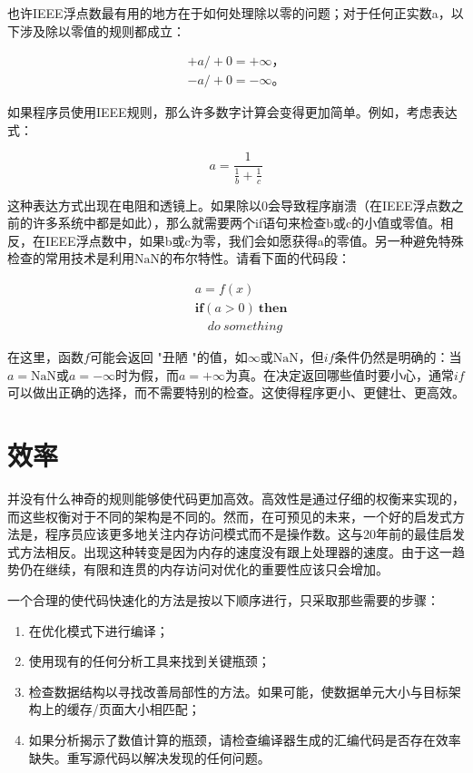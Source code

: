 \documentclass[lang=cn,12pt]{elegantbook}
\begin{document}
也许IEEE浮点数最有用的地方在于如何处理除以零的问题；对于任何正实数a，以下涉及除以零值的规则都成立：

\[
  \begin{aligned}
  +a /+0=+\infty， \\
  -a /+0=-\infty。 
  \end{aligned}
\]


如果程序员使用IEEE规则，那么许多数字计算会变得更加简单。例如，考虑表达式：

\[a=\frac{1}{\frac{1}{b}+\frac{1}{c}}\]

这种表达方式出现在电阻和透镜上。如果除以0会导致程序崩溃（在IEEE浮点数之前的许多系统中都是如此），那么就需要两个if语句来检查b或c的小值或零值。相反，在IEEE浮点数中，如果b或c为零，我们会如愿获得a的零值。另一种避免特殊检查的常用技术是利用$\mathrm{NaN}$的布尔特性。请看下面的代码段：

\[
  \begin{aligned}
  &a=f(x) \\
  &\textbf{if}(a>0) \  \textbf{then} \\ 
  &\quad do \  something
  \end{aligned}
\]

在这里，函数$f$可能会返回 "丑陋 "的值，如$\infty$或$\mathrm{NaN}$，但$if$条件仍然是明确的：当$a=\mathrm{NaN}$或$a=-\infty$时为假，而$a=+\infty$为真。在决定返回哪些值时要小心，通常$if$可以做出正确的选择，而不需要特别的检查。这使得程序更小、更健壮、更高效。

\section{效率}

并没有什么神奇的规则能够使代码更加高效。高效性是通过仔细的权衡来实现的，而这些权衡对于不同的架构是不同的。然而，在可预见的未来，一个好的启发式方法是，程序员应该更多地关注内存访问模式而不是操作数。这与20年前的最佳启发式方法相反。出现这种转变是因为内存的速度没有跟上处理器的速度。由于这一趋势仍在继续，有限和连贯的内存访问对优化的重要性应该只会增加。

一个合理的使代码快速化的方法是按以下顺序进行，只采取那些需要的步骤：

\begin{enumerate}
  \item 在优化模式下进行编译；
  \item 使用现有的任何分析工具来找到关键瓶颈；
  \item 检查数据结构以寻找改善局部性的方法。如果可能，使数据单元大小与目标架构上的缓存/页面大小相匹配；
  \item 如果分析揭示了数值计算的瓶颈，请检查编译器生成的汇编代码是否存在效率缺失。重写源代码以解决发现的任何问题。
\end{enumerate}
\end{document}
